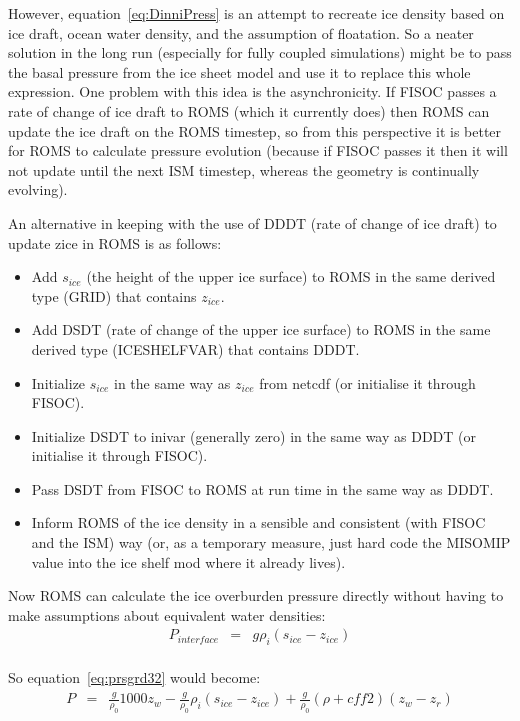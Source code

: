 \documentclass[12pt]{article}
\begin{document}
However, equation~\ref{eq:DinniPress} is an attempt to recreate ice density based on ice draft, ocean water density, 
and the assumption of floatation.
So a neater solution in the long run (especially for fully coupled simulations) might be to 
pass the basal pressure from the ice sheet model and use it to replace this whole expression. 
One problem with this idea is the asynchronicity.  If FISOC passes a rate of change of ice draft to ROMS 
(which it currently does) then ROMS can update 
the ice draft on the ROMS timestep, so from this perspective it is better for ROMS to calculate pressure evolution 
(because if FISOC passes it then it will not update until the next ISM timestep, whereas the geometry is continually evolving). 

An alternative in keeping with the use of DDDT (rate of change of ice draft) to update zice in ROMS is as follows:
\begin{itemize}
\item Add $s_{ice}$ (the height of the upper ice surface) to ROMS in the same derived type (GRID) that contains $z_{ice}$.
\item Add DSDT (rate of change of the upper ice surface) to ROMS in the same derived type (ICESHELFVAR) that contains DDDT.
\item Initialize $s_{ice}$ in the same way as $z_{ice}$ from netcdf (or initialise it through FISOC).
\item Initialize DSDT to inivar (generally zero) in the same way as DDDT (or initialise it through FISOC).
\item Pass DSDT from FISOC to ROMS at run time in the same way as DDDT.
\item Inform ROMS of the ice density in a sensible and consistent (with FISOC and the ISM) way (or, as a temporary 
measure, just hard code the MISOMIP value into the ice shelf mod where it already lives).
\end{itemize}
Now ROMS can calculate the ice overburden pressure directly without having to make assumptions about equivalent water densities: 
\begin{eqnarray}
\nonumber P_{interface} & = & g \rho_i (s_{ice} - z_{ice}) \\
\label{eqn:pinterface}
\end{eqnarray}

So equation~\ref{eq:prsgrd32} would become:
\begin{eqnarray}
\nonumber P & = & \frac{g}{\rho_0}1000 z_w- \frac{g}{\rho_0}\rho_i (s_{ice} - z_{ice})+\frac{g}{\rho_0}(\rho+{cff2})(z_w-z_r) \\
\nonumber 
\end{eqnarray}
\end{document}
